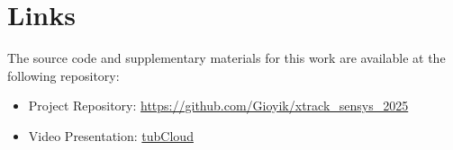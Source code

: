 \documentclass[11pt, a4paper]{article}
\begin{document}
\appendix
\section{Links}

The source code and supplementary materials for this work are available at the following repository:

\begin{itemize}
    \item Project Repository: \href{https://github.com/Gioyik/xtrack_sensys_2025}{https://github.com/Gioyik/xtrack_sensys_2025}
    \item Video Presentation: \href{https://tubcloud.tu-berlin.de/s/oc8aTzg3sCLFqn2}{tubCloud}
\end{itemize}
\end{document}
